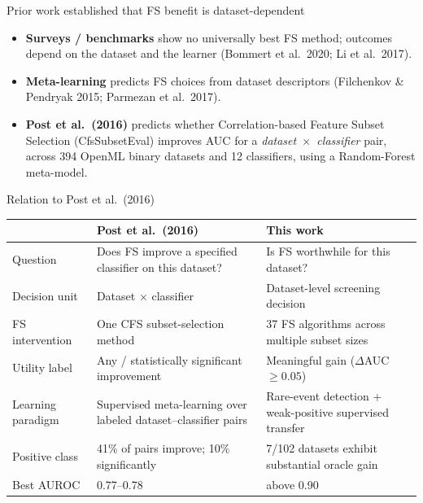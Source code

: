 \documentclass[aspectratio=169,10pt,dvipsnames]{beamer}
\begin{document}
\begin{frame}{Prior work established that FS benefit is dataset-dependent}
\vspace{0.2cm}
\begin{itemize}
  \item \textbf{Surveys / benchmarks} show no universally best FS method;
        outcomes depend on the dataset and the learner
        (Bommert et al.\ 2020; Li et al.\ 2017).
  \item \textbf{Meta-learning} predicts FS choices from dataset
        descriptors (Filchenkov \& Pendryak 2015; Parmezan et al.\ 2017).
  \item \textbf{Post et al.\ (2016)} predicts
        whether  Correlation-based Feature Subset Selection (CfsSubsetEval) improves AUC for a \emph{dataset~$\times$~classifier} pair,
        across 394 OpenML binary datasets and 12 classifiers, using a
        Random-Forest meta-model.
\end{itemize}


\end{frame}

\begin{frame}{Relation to Post et al.\ (2016)}


\centering
\footnotesize
\renewcommand{\arraystretch}{1.35}
\setlength{\tabcolsep}{8pt}
\begin{tabular}{@{}p{2.3cm}p{4.8cm}p{4.8cm}@{}}
\toprule
 & \textbf{Post et al.\ (2016)} & \textbf{This work} \\
\midrule
Question
& Does FS improve a specified classifier on this dataset?
& Is FS worthwhile for this dataset? \\

Decision unit
& Dataset $\times$ classifier
& Dataset-level screening decision \\

FS intervention
& One CFS subset-selection method
& 37 FS algorithms across multiple subset sizes \\

Utility label
& Any / statistically significant improvement
& Meaningful gain ($\Delta$AUC $\geq 0.05$) \\

Learning paradigm
& Supervised meta-learning over labeled dataset--classifier pairs
& Rare-event detection + weak-positive supervised transfer \\

Positive class
& 41\% of pairs improve; 10\% significantly
& 7/102 datasets exhibit substantial oracle gain \\

Best AUROC
& 0.77--0.78
& above 0.90  \\

\bottomrule
\end{tabular}

\end{frame}
\end{document}
